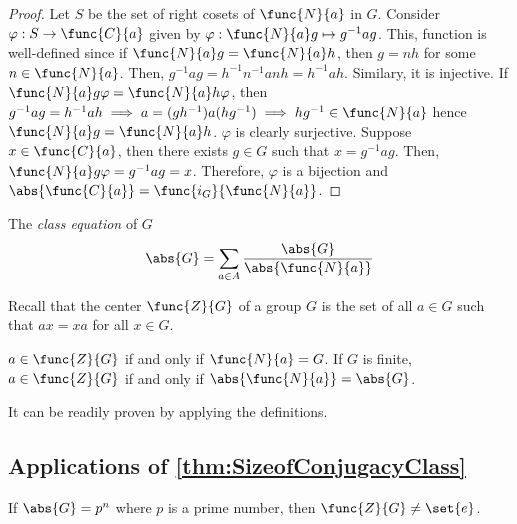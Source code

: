 \begin{proof}
    Let \(S\) be the set of right cosets of \(\func{N}{a}\) in \(G\). Consider \(\varphi : S \to \func{C}{a}\) given by \(\varphi: \func{N}{a}g \mapsto g^{-1}ag\). This, function is well-defined since if \(\func{N}{a}g = \func{N}{a}h\), then \(g = nh\) for some \(n \in \func{N}{a}\). Then, \(g^{-1}ag = h^{-1}n^{-1}anh = h^{-1}ah\). Similary, it is injective. If \(\func{N}{a}g \varphi = \func{N}{a}h \varphi\), then \(g^{-1}ag = h^{-1}a h \implies a=(gh^{-1})a (hg^{-1}) \implies hg^{-1} \in \func{N}{a}\) hence \(\func{N}{a}g = \func{N}{a}h\). \(\varphi\) is clearly surjective. Suppose \(x \in \func{C}{a}\), then there exists \(g \in G\) such that \(x = g^{-1}ag\). Then, \(\func{N}{a}g \varphi = g^{-1}ag = x\). Therefore, \(\varphi\) is a bijection and \(\abs{\func{C}{a}} = \func{i_G}{\func{N}{a}}\).
\end{proof}
\begin{corollary}\label{cor:classEquation}
    The \textit{class equation} of \(G\)
    \begin{equation*}
        \abs{G} = \sum_{a \in A} \dfrac{\abs{G}}{\abs{\func{N}{a}}}
    \end{equation*}
\end{corollary}

Recall that the center \(\func{Z}{G}\) of a group \(G\) is the set of all \(a \in G\) such that \(ax = xa\) for all \(x \in G\). 

\begin{lemma}
    \(a \in \func{Z}{G}\) if and only if \(\func{N}{a} = G\). If \(G\) is finite, \(a \in \func{Z}{G}\) if and only if \(\abs{\func{N}{a}} = \abs{G}\).
\end{lemma}

\begin{prooflemma}
    It can be readily proven by applying the definitions.
\end{prooflemma}

\subsection{Applications of \ref{thm:SizeofConjugacyClass}}

\begin{theorem}
    If \(\abs{G} = p^n\) where \(p\) is a prime number, then \(\func{Z}{G} \neq \set{e}\).
\end{theorem}

